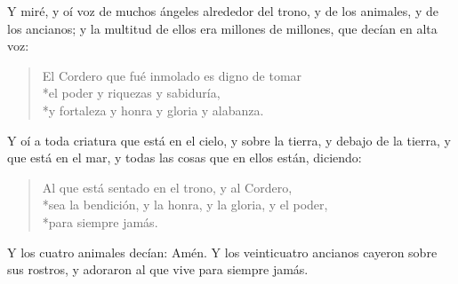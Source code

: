 Y miré, y oí voz de muchos ángeles alrededor del trono, y de los animales, y de los ancianos; y la multitud de ellos era millones de millones,%
que decían en alta voz:
\begin{verse}
El Cordero que fué inmolado es digno de tomar\\*\vin el poder y riquezas y sabiduría,\\*\vin  y fortaleza y honra y gloria y alabanza.
\end{verse}
Y oí a toda criatura que está en el cielo, y sobre la tierra, y debajo de la tierra, y que está en el mar, y todas las cosas que en ellos están, diciendo:
\begin{verse}
Al que está sentado en el trono, y al Cordero,\\*\vin sea la bendición, y la honra, y la gloria, y el poder,\\*\vin para siempre jamás.
\end{verse}
Y los cuatro animales decían: Amén. Y los veinticuatro ancianos cayeron sobre sus rostros, y adoraron al que vive para siempre jamás.

